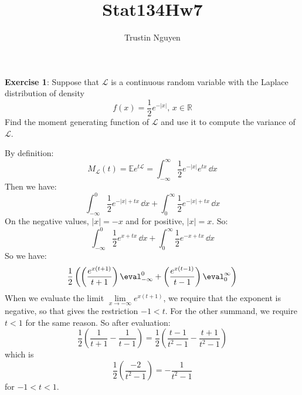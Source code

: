 \documentclass{article}
\title{Stat134Hw7}
\author{Trustin Nguyen}
\begin{document}
    \maketitle

\reversemarginpar

\textbf{Exercise 1}: Suppose that $\mathcal{L}$ is a continuous random variable with the Laplace distribution of density
    \begin{equation*}
        f(x) = \dfrac{1}{2}e^{-\lvert x \rvert}, \, x \in \mathbb{R}
    \end{equation*}
Find the moment generating function of $\mathcal{L}$ and use it to compute the variance of $\mathcal{L}$.
    \begin{answer}
        By definition:
            \begin{equation*}
                M_{\mathcal{L}}(t) = \mathbb{E}e^{t\mathcal{L}} = \int_{-\infty}^{\infty} \dfrac{1}{2}e^{-\lvert x \rvert}e^{tx} \, \dd{x} 
            \end{equation*}
        Then we have:
            \begin{equation*}
                \int_{-\infty}^{0} \dfrac{1}{2}e^{-\lvert x \rvert + tx} \, \dd{x}  + \int_{0}^{\infty} \dfrac{1}{2} e^{-\lvert x \rvert + tx} \, \dd{x} 
            \end{equation*}
        On the negative values, $\lvert x \rvert = -x$ and for positive, $\lvert x \rvert = x$. So:
            \begin{equation*}
                \int_{-\infty}^{0} \dfrac{1}{2}e^{x + tx} \, \dd{x}  + \int_{0}^{\infty} \dfrac{1}{2}e^{-x + tx} \, \dd{x} 
            \end{equation*}
        So we have:
            \begin{equation*}
                \dfrac{1}{2}\left(\left(\dfrac{e^{x(t + 1)}}{t + 1}\right)\eval_{-\infty}^{0} + \left(\dfrac{e^{x(t - 1)}}{t - 1}\right)\eval_{0}^{\infty}\right)
            \end{equation*}
        When we evaluate the limit $\lim\limits_{x \to -\infty} e^{x(t + 1)}$, we require that the exponent is negative, so that gives the restriction $-1 < t$. For the other summand, we require $t < 1$ for the same reason. So after evaluation:
            \begin{equation*}
                \dfrac{1}{2}\left(\dfrac{1}{t + 1} - \dfrac{1}{t - 1}\right) = \dfrac{1}{2}\left(\dfrac{t - 1}{t^{2} - 1} - \dfrac{t + 1}{t^{2} - 1}\right)
            \end{equation*}
        which is 
            \begin{equation*}
                \dfrac{1}{2}\left(\dfrac{-2}{t^{2} - 1}\right) = -\dfrac{1}{t^{2} - 1}
            \end{equation*}
        for $-1 < t < 1$.
    \end{answer}
\end{document}
